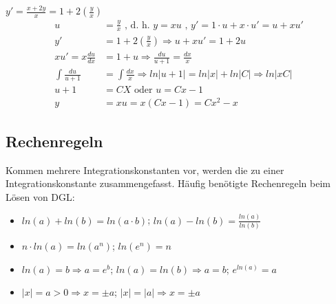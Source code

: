 \begin{bsp}
$y' = \frac{x+2y}{x} = 1 + 2\left(\frac{y}{x}\right)$
\begin{align*}
u &= \frac{y}{x} \text{ , d. h. } y=xu \text{ , } y' = 1 \cdot u + x \cdot u' = u + xu' \\
y' &= 1 + 2\left(\frac{y}{x}\right) \Rightarrow u + xu' = 1+ 2u\\
xu' = x \frac{du}{dx} &= 1 + u \Rightarrow \frac{du}{u+1} = \frac{dx}{x} \\
\int \frac{du}{u+1} &= \int \frac{dx}{x} \Rightarrow ln|u + 1| = ln|x| + ln |C| \Rightarrow ln|xC| \\
u + 1 &= C X \text{  oder } u = Cx -1\\
y & = xu = x(Cx -1) = Cx^2-x
\end{align*}
\end{bsp}

\subsection{Rechenregeln}
Kommen mehrere Integrationskonstanten vor, werden die zu einer Integrationskonstante zusammengefasst.
Häufig benötigte Rechenregeln beim Lösen von DGL:
\begin{itemize}
		\item $ln(a) + ln(b) = ln ( a \cdot b)$; $ln(a) - ln(b) = \frac{ln(a)}{ln(b)}$
		\item $n \cdot ln (a) = ln (a^n)$; $ln (e^n)  = n$
		\item $ ln (a) = b \Rightarrow a = e^b$; $ln(a) = ln (b) \Rightarrow a = b$; $e^{ln(a)} = a$
		\item $|x| = a > 0 \Rightarrow x = \pm a$; $|x| = |a| \Rightarrow x = \pm a$
\end{itemize}
